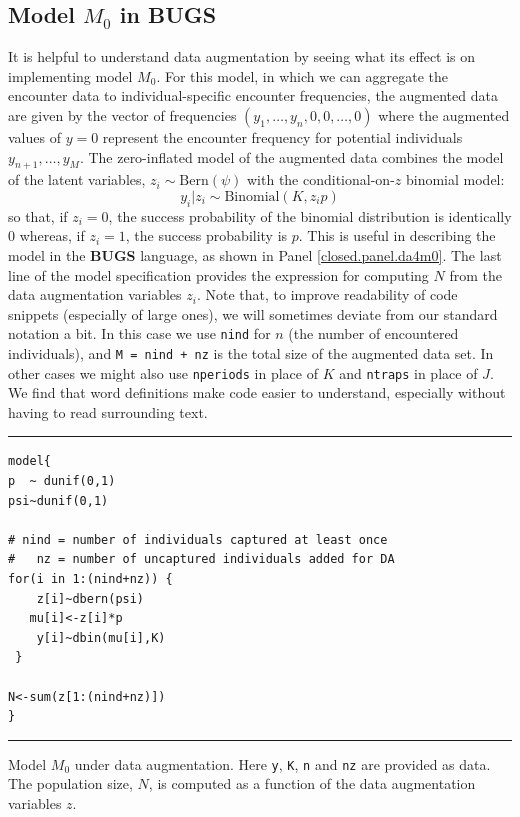 \subsection{Model $M_0$ in BUGS}

It is helpful to understand data augmentation by seeing what its
effect is on implementing model $M_0$. For this model,
 in which we can aggregate the encounter data to
individual-specific encounter frequencies, the augmented data are
given by the vector of frequencies $(y_{1}, \ldots, y_{n}, 0, 0,
\ldots, 0)$ where the augmented values of $y=0$ represent the encounter
frequency  for potential individuals $y_{n+1},\ldots,y_{M}$.
The zero-inflated model of the augmented data combines
the model of the latent variables, $z_{i} \sim \mbox{Bern}(\psi)$ with
the conditional-on-$z$ binomial model:
\[
y_{i}|z_{i}   \sim \mbox{Binomial}(K,z_{i} p)
\]
so that, if $z_{i}=0$, the success probability of the binomial
distribution is identically 0 whereas, if $z_{i}=1$, the success
probability is $p$. This is useful in describing the model in the {\bf
  BUGS} language, as shown in Panel \ref{closed.panel.da4m0}.
 The last line of the model
specification  provides the expression for computing $N$ from the
data augmentation variables $z_{i}$. Note that, to improve readability of code
snippets (especially of large ones), we will sometimes deviate from our
standard notation a bit. In this case we use \mbox{\tt nind} for $n$
(the number of encountered individuals), and \mbox{\tt M = nind + nz}
is the total size of the augmented data set. In other cases we might
also use \mbox{\tt nperiods} in place of $K$ and \mbox{\tt ntraps} in
place of $J$. We find that word definitions make code easier to
understand, especially without having to read surrounding text.

\begin{panel}[ht]
\centering
\rule[0.15in]{\textwidth}{.03in}
{\small
\begin{verbatim}
model{
p  ~ dunif(0,1)
psi~dunif(0,1)

# nind = number of individuals captured at least once
#   nz = number of uncaptured individuals added for DA
for(i in 1:(nind+nz)) {
    z[i]~dbern(psi)
   mu[i]<-z[i]*p
    y[i]~dbin(mu[i],K)
 }

N<-sum(z[1:(nind+nz)])
}
\end{verbatim}
}
\rule[-0.15in]{\textwidth}{.03in}
\caption{Model $M_{0}$ under data augmentation. Here \mbox{\tt y},
  \mbox{\tt K}, \mbox{\tt n} and \mbox{\tt nz} are provided as
  data. The population size, $N$, is computed as a function of
the data augmentation variables $z$. }
\label{closed.panel.da4m0}
\end{panel}





